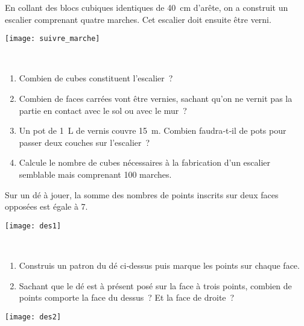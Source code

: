 \begin{exercice}
\begin{minipage}[c]{0.52\linewidth} 
En collant des blocs cubiques identiques de 40 cm d'arête, on a construit un escalier comprenant quatre marches. Cet escalier doit ensuite être verni.
 \end{minipage} \hfill%
 \begin{minipage}[c]{0.44\linewidth}
 \texttt{[image: suivre\_marche]}
  \end{minipage} \\
\begin{enumerate}
 \item Combien de cubes constituent l'escalier ?
 \item Combien de faces carrées vont être vernies, sachant qu'on ne vernit pas la partie en contact avec le sol ou avec le mur ?
 \item Un pot de 1 L de vernis couvre 15 m. Combien faudra‑t‑il de pots pour passer deux couches sur l'escalier ? 
 \item Calcule le nombre de cubes nécessaires à la fabrication d'un escalier semblable mais comprenant 100 marches.
 \end{enumerate}
\end{exercice}


\begin{exercice}
\begin{minipage}[c]{0.78\linewidth} 
Sur un dé à jouer, la somme des nombres de points inscrits sur deux faces opposées est égale à 7.
 \end{minipage} \hfill%
 \begin{minipage}[c]{0.18\linewidth}
 \texttt{[image: des1]}
  \end{minipage} \\
\begin{minipage}[c]{0.78\linewidth} 
\begin{enumerate}
 \item Construis un patron du dé ci‑dessus puis marque les points sur chaque face.
 \item Sachant que le dé est à présent posé sur la face à trois points, combien de points comporte la face du dessus ? Et la face de droite ?
 \end{enumerate}
 \end{minipage} \hfill%
 \begin{minipage}[c]{0.18\linewidth}
 \texttt{[image: des2]}
  \end{minipage} \\
\end{exercice}


